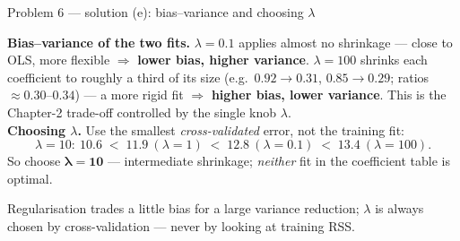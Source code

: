 \documentclass[aspectratio=169,11pt]{beamer}
\begin{document}
\begin{frame}{Problem 6 --- solution (e): bias--variance and choosing $\lambda$}
  \begin{solutionbox}
    \textbf{Bias--variance of the two fits.}
    $\lambda=0.1$ applies almost no shrinkage --- close to OLS, more flexible $\Rightarrow$
    \textbf{lower bias, higher variance}. $\lambda=100$ shrinks each coefficient to roughly
    a third of its size (e.g.\ $0.92\to0.31$, $0.85\to0.29$; ratios $\approx 0.30$--$0.34$)
    --- a more rigid fit $\Rightarrow$ \textbf{higher bias, lower variance}. This is the
    Chapter-2 trade-off controlled by the single knob $\lambda$.\\[1mm]
    \textbf{Choosing $\lambda$.} Use the smallest \emph{cross-validated} error, not the
    training fit:
    \[
      \lambda=10:\ 10.6 \;<\; 11.9\ (\lambda{=}1) \;<\; 12.8\ (\lambda{=}0.1) \;<\; 13.4\ (\lambda{=}100).
    \]
    So choose $\boldsymbol{\lambda=10}$ --- intermediate shrinkage; \emph{neither} fit in
    the coefficient table is optimal.
  \end{solutionbox}
  \begin{takeaway}
    Regularisation trades a little bias for a large variance reduction; $\lambda$ is always
    chosen by cross-validation --- never by looking at training RSS.
  \end{takeaway}
\end{frame}
\end{document}
